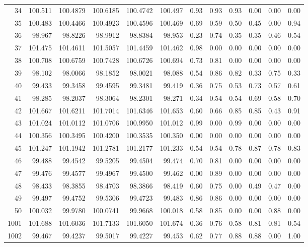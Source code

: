 \begin{table}[p]
\begin{tabular}{@{}rrrrrr|rr|rrrr@{}}
34 & 100.511 & 100.4879 & 100.6185 & 100.4742 & 100.497 & 0.93 & 0.93 & 0.93 & 0.00 & 0.00 & 0.00 \\
35 & 100.483 & 100.4466 & 100.4923 & 100.4596 & 100.469 & 0.69 & 0.59 & 0.50 & 0.45 & 0.00 & 0.94 \\
36 & 98.967 & 98.8226 & 98.9912 & 98.8384 & 98.953 & 0.23 & 0.74 & 0.35 & 0.35 & 0.46 & 0.54 \\
37 & 101.475 & 101.4611 & 101.5057 & 101.4459 & 101.462 & 0.98 & 0.00 & 0.00 & 0.00 & 0.00 & 0.00 \\
38 & 100.708 & 100.6759 & 100.7428 & 100.6726 & 100.694 & 0.73 & 0.81 & 0.00 & 0.00 & 0.00 & 0.00 \\
39 & 98.102 & 98.0066 & 98.1852 & 98.0021 & 98.088 & 0.54 & 0.86 & 0.82 & 0.33 & 0.75 & 0.33 \\
40 & 99.433 & 99.3458 & 99.4595 & 99.3481 & 99.419 & 0.36 & 0.75 & 0.53 & 0.73 & 0.57 & 0.61 \\
41 & 98.285 & 98.2037 & 98.3064 & 98.2301 & 98.271 & 0.34 & 0.54 & 0.54 & 0.69 & 0.58 & 0.70 \\
42 & 101.667 & 101.6211 & 101.7014 & 101.6346 & 101.653 & 0.60 & 0.66 & 0.85 & 0.85 & 0.43 & 0.91 \\
43 & 101.024 & 101.0112 & 101.0706 & 100.9950 & 101.012 & 0.99 & 0.00 & 0.99 & 0.00 & 0.00 & 0.00 \\
44 & 100.356 & 100.3495 & 100.4200 & 100.3535 & 100.350 & 0.00 & 0.00 & 0.00 & 0.00 & 0.00 & 0.00 \\
45 & 101.247 & 101.1942 & 101.2781 & 101.2177 & 101.233 & 0.54 & 0.54 & 0.78 & 0.87 & 0.78 & 0.83 \\
46 & 99.488 & 99.4542 & 99.5205 & 99.4504 & 99.474 & 0.70 & 0.81 & 0.00 & 0.00 & 0.00 & 0.00 \\
47 & 99.476 & 99.4577 & 99.4967 & 99.4500 & 99.462 & 0.00 & 0.89 & 0.00 & 0.00 & 0.00 & 0.00 \\
48 & 98.433 & 98.3855 & 98.4703 & 98.3866 & 98.419 & 0.60 & 0.75 & 0.00 & 0.49 & 0.47 & 0.00 \\
49 & 99.497 & 99.4752 & 99.5306 & 99.4723 & 99.483 & 0.86 & 0.86 & 0.00 & 0.00 & 0.00 & 0.00 \\
50 & 100.032 & 99.9780 & 100.0741 & 99.9668 & 100.018 & 0.58 & 0.85 & 0.00 & 0.00 & 0.88 & 0.00 \\
\midrule
1001 & 101.688 & 101.6036 & 101.7133 & 101.6050 & 101.674 & 0.36 & 0.76 & 0.58 & 0.81 & 0.81 & 0.54 \\
1002 & 99.467 & 99.4237 & 99.5017 & 99.4227 & 99.453 & 0.62 & 0.77 & 0.88 & 0.88 & 0.00 & 1.00 \\

\end{tabular}
\end{table}
